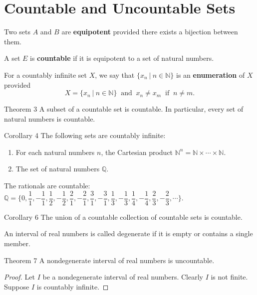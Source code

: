 \section{Countable and Uncountable Sets}

\begin{flushleft}

Two sets $A$ and $B$ are \textbf{equipotent} provided there exists a bijection between them.\par
A set $E$ is \textbf{countable} if it is equipotent to a set of natural numbers.\par
For a countably infinite set $X$, we say that $\{x_n \ |\ n \in \mathbb{N} \}$ is an \textbf{enumeration} of $X$ provided
\[
	X = \{x_n \ |\ n \in \mathbb{N} \} \ \text{ and }\ x_n \neq x_m \ \text{ if }\ n \neq m. 
\]
\par
\medskip
\begin{namedthm*}{Theorem 3}
	A subset of a countable set is countable. In particular, every set of natural numbers is countable.
\end{namedthm*}
\begin{namedthm*}{Corollary 4}
	The following sets are countably infinite:
	\begin{enumerate}[label=(\roman*),align=left]
		\item For each natural numbers $n$, the Cartesian product $\mathbb{N}^n = \mathbb{N} \times \cdots \times \mathbb{N}$.
		\item The set of natural numbers $\mathbb{Q}$.
	\end{enumerate}
\end{namedthm*}
\par
\medskip
The rationals are countable: 
$\mathbb{Q} = \{0,\dfrac{1}{1},-\dfrac{1}{1},\dfrac{1}{2},-\dfrac{1}{2},\dfrac{2}{1},-\dfrac{2}{1}, \dfrac{3}{1}, -\dfrac{3}{1},\dfrac{1}{3},-\dfrac{1}{3},\dfrac{1}{4},-\dfrac{1}{4},\dfrac{2}{3},-\dfrac{2}{3},\cdots \}$.
\par
\medskip
\begin{namedthm*}{Corollary 6}
The union of a countable collection of countable sets is countable.
\end{namedthm*}
An interval of real numbers is called degenerate if it is empty or contains a single member.
\begin{namedthm*}{Theorem 7}
A nondegenerate interval of real numbers is uncountable.	
\end{namedthm*}
\begin{proof}
Let $I$ be a nondegenerate interval of real numbers. Clearly $I$ is not finite. Suppose $I$ is countably infinite.

\end{proof}
\end{flushleft}
